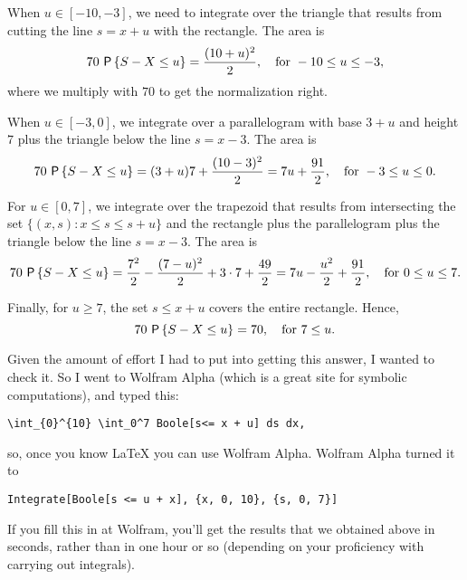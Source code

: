 \begin{exercise}
\begin{solution}
When $u\in[-10, -3]$, we need to integrate over the triangle that results from cutting the line $s=x+u$ with the rectangle. The area is 
\begin{equation*}
70\, \P{S-X \leq u}= \frac{(10+u)^2}2, \quad \text{for } -10 \leq u\leq -3,
\end{equation*}
where we multiply with $70$ to get the normalization right. 

When $u\in[-3, 0]$, we integrate over a parallelogram with base $3+u$ and height $7$ plus the triangle below the line $s=x-3$. The area is 
\begin{equation*}
70\, \P{S-X \leq u}= (3+u)7 + \frac{(10-3)^2}2=7u + \frac{91}2, \quad \text{for } -3 \leq u\leq 0.
\end{equation*}

For $u\in[0, 7]$, we integrate over the trapezoid that results from intersecting the set $\{(x,s) : x \leq s \leq s + u\}$ and the rectangle plus the parallelogram plus the triangle below the line $s=x-3$. The area is 
\begin{equation*}
70\, \P{S-X \leq u}= \frac{7^2}2 - \frac{(7-u)^2}{2} + 3\cdot 7 + \frac{49}2 = 7 u - \frac{u^2}2 + \frac{91}2, \quad \text{for } 0\leq u\leq 7.
\end{equation*}

Finally, for $u\geq 7$, the set $s\leq x+u$ covers the entire rectangle. Hence, 
\begin{equation*}
70\, \P{S-X \leq u}= 70, \quad \text{for } 7\leq u.
\end{equation*}

Given the amount of effort I had to put into getting this answer, I wanted to check it. So I went to Wolfram Alpha (which is a great site for symbolic computations), and typed this: 
\begin{verbatim}
\int_{0}^{10} \int_0^7 Boole[s<= x + u] ds dx,
\end{verbatim}
so, once you know \LaTeX\/ you can use Wolfram Alpha. Wolfram Alpha turned it to 
\begin{verbatim}
Integrate[Boole[s <= u + x], {x, 0, 10}, {s, 0, 7}]
\end{verbatim}
If you fill this in at Wolfram, you'll get the results that we obtained above in seconds, rather than in one hour or so (depending on your proficiency with carrying out integrals).
\end{solution}
\end{exercise}


